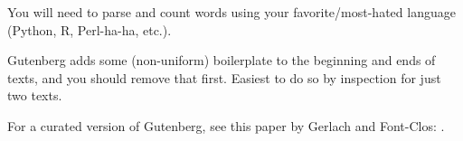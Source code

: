 \begin{enumerate}
       You will need to parse and count words using your favorite/most-hated language
       (Python, R, Perl-ha-ha, etc.).

       Gutenberg adds some (non-uniform) boilerplate to the beginning and
       ends of texts, and you should remove that first.  Easiest to do so
       by inspection for just two texts.

       For a curated version of Gutenberg, see this paper by Gerlach and Font-Clos:
       .

       
   \solutionstart


   \solutionend

       



\end{enumerate}
